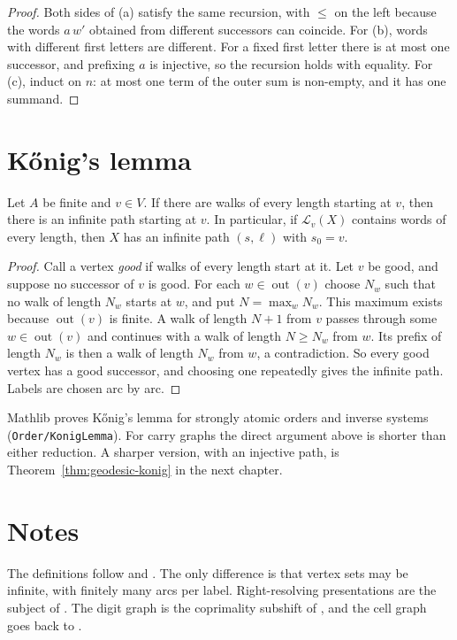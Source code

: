 \begin{proof}
Both sides of (a) satisfy the same recursion, with \(\le\) on the left because the words
\(a\,w'\) obtained from different successors can coincide. For (b), words with different first
letters are different. For a fixed first letter there is at most one successor, and prefixing
\(a\) is injective, so the recursion holds with equality. For (c), induct on \(n\): at most one
term of the outer sum is non-empty, and it has one summand.
\end{proof}

\section{Kőnig's lemma}

\begin{theorem}[Kőnig]\label{thm:konig}
Let \(A\) be finite and \(v\in V\). If there are walks of every length starting at \(v\), then
there is an infinite path starting at \(v\). In particular, if \(\mathcal L_v(X)\) contains
words of every length, then \(X\) has an infinite path \((s,\ell)\) with \(s_0=v\).
\end{theorem}

\begin{proof}
Call a vertex \emph{good} if walks of every length start at it. Let \(v\) be good, and suppose
no successor of \(v\) is good. For each \(w\in\operatorname{out}(v)\) choose \(N_w\) such that no
walk of length \(N_w\) starts at \(w\), and put \(N=\max_wN_w\). This maximum exists because
\(\operatorname{out}(v)\) is finite. A walk of length \(N+1\) from \(v\) passes through some
\(w\in\operatorname{out}(v)\) and continues with a walk of length \(N\ge N_w\) from \(w\). Its
prefix of length \(N_w\) is then a walk of length \(N_w\) from \(w\), a contradiction. So every
good vertex has a good successor, and choosing one repeatedly gives the infinite path. Labels
are chosen arc by arc.
\end{proof}

Mathlib proves Kőnig's lemma for strongly atomic orders and inverse systems
(\texttt{Order/KonigLemma}). For carry graphs the direct argument above is shorter than
either reduction. A sharper version, with an injective path, is Theorem~\ref{thm:geodesic-konig}
in the next chapter.

\section*{Notes}
The definitions follow \cite[§2.2, §3.1]{LM95} and \cite[§1.2]{BJG09}. The only difference is
that vertex sets may be infinite, with finitely many arcs per label. Right-resolving
presentations are the subject of \cite[§3.3]{LM95}. The digit graph is the coprimality subshift
of \cite{FS67,Dub09}, and the cell graph goes back to \cite{FLP95}.

